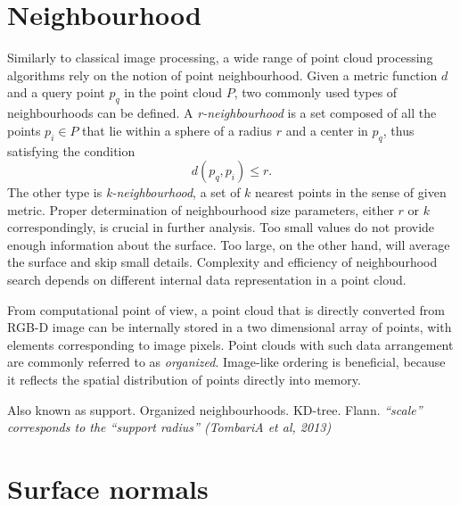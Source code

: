 

\section{Neighbourhood}
\label{sec:neighbourhood}

Similarly to classical image processing, a wide range of point cloud processing algorithms rely on the notion of point neighbourhood. Given a metric function $d$ and a query point $p_q$ in the point cloud $P$, two commonly used types of neighbourhoods can be defined. A \textit{r-neighbourhood} is a set composed of all the points $p_i \in P$ that lie within a sphere of a radius $r$ and a center in $p_q$, thus satisfying the condition
\begin{equation}
d(p_	q, p_i) \leq r.
\end{equation}
The other type is \textit{k-neighbourhood}, a set of $k$ nearest points in the sense of given metric. Proper determination of neighbourhood size parameters, either $r$ or $k$ correspondingly, is crucial in further analysis. Too small values do not provide enough information about the surface. Too large, on the other hand, will average the surface and skip small details. Complexity and efficiency of neighbourhood search depends on different internal data representation in a point cloud.

From computational point of view, a point cloud that is directly converted from RGB-D image can be internally stored in a two dimensional array of points, with elements corresponding to image pixels. Point clouds with such data arrangement are commonly referred to as \textit{organized}. Image-like ordering is beneficial, because it reflects the spatial distribution of points directly into memory.


Also known as support.
Organized neighbourhoods.
KD-tree.
Flann.
\textit{“scale” corresponds to the “support radius” (TombariA et al, 2013)}

\section{Surface normals}
\label{sec:normals}

